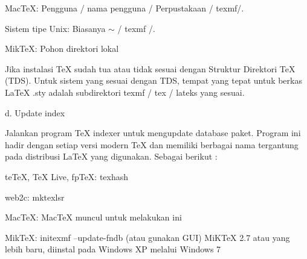 \begin{enumerate}
MacTeX: Pengguna / nama pengguna / Perpustakaan / texmf/. \par     
Sistem tipe Unix: Biasanya  $ \sim $  / texmf /. \par       
MikTeX: Pohon direktori lokal \par

\vspace{8pt}
\hspace{0.50in}Jika instalasi TeX sudah tua atau tidak sesuai dengan Struktur Direktori TeX (TDS). Untuk sistem yang sesuai dengan TDS, tempat yang tepat untuk berkas LaTeX .sty adalah subdirektori texmf / tex / lateks yang sesuai.\par

\vspace{8pt}
\noindent d. Update index  \par
\hspace{0.50in} Jalankan program TeX indexer untuk mengupdate database paket. Program ini hadir dengan setiap versi modern TeX dan memiliki berbagai nama tergantung pada distribusi LaTeX yang digunakan. Sebagai berikut :\par

teTeX, TeX Live, fpTeX: texhash \par
web2c: mktexlsr \par
MacTeX: MacTeX muncul untuk melakukan ini \par
MikTeX: initexmf --update-fndb (atau gunakan GUI)
MiKTeX 2.7 atau yang lebih baru, diinstal pada Windows XP melalui Windows 7 \par


\end{enumerate}
